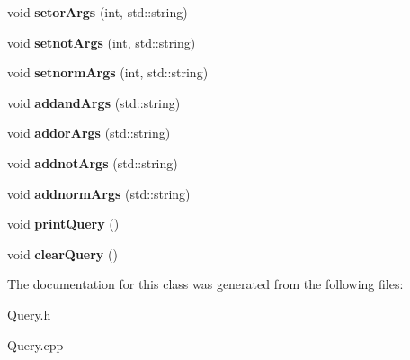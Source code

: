 \begin{DoxyCompactItemize}
\item 
\hypertarget{class_query_afb2f5f87786fc282fefface523a81138}{void {\bfseries setor\+Args} (int, std\+::string)}\label{class_query_afb2f5f87786fc282fefface523a81138}

\item 
\hypertarget{class_query_aef14c309f6f5880066f649a8f47fe3bc}{void {\bfseries setnot\+Args} (int, std\+::string)}\label{class_query_aef14c309f6f5880066f649a8f47fe3bc}

\item 
\hypertarget{class_query_a24a65f32cdc1c1ee4246cbf480763557}{void {\bfseries setnorm\+Args} (int, std\+::string)}\label{class_query_a24a65f32cdc1c1ee4246cbf480763557}

\item 
\hypertarget{class_query_a308104a6371bdf950435593413d527a6}{void {\bfseries addand\+Args} (std\+::string)}\label{class_query_a308104a6371bdf950435593413d527a6}

\item 
\hypertarget{class_query_aa19cc7a02d5e11c44118760bad4d0f50}{void {\bfseries addor\+Args} (std\+::string)}\label{class_query_aa19cc7a02d5e11c44118760bad4d0f50}

\item 
\hypertarget{class_query_a1923e0fdb1a976e23dc79731722d4fa3}{void {\bfseries addnot\+Args} (std\+::string)}\label{class_query_a1923e0fdb1a976e23dc79731722d4fa3}

\item 
\hypertarget{class_query_a038cf2204b03b09bd8423ee919c6866b}{void {\bfseries addnorm\+Args} (std\+::string)}\label{class_query_a038cf2204b03b09bd8423ee919c6866b}

\item 
\hypertarget{class_query_a3b9c243533681f606dd784934d03ab10}{void {\bfseries print\+Query} ()}\label{class_query_a3b9c243533681f606dd784934d03ab10}

\item 
\hypertarget{class_query_aa8b2a46725fdad4e06aad405b6c18227}{void {\bfseries clear\+Query} ()}\label{class_query_aa8b2a46725fdad4e06aad405b6c18227}

\end{DoxyCompactItemize}


The documentation for this class was generated from the following files\+:\begin{DoxyCompactItemize}
\item 
Query.\+h\item 
Query.\+cpp\end{DoxyCompactItemize}
